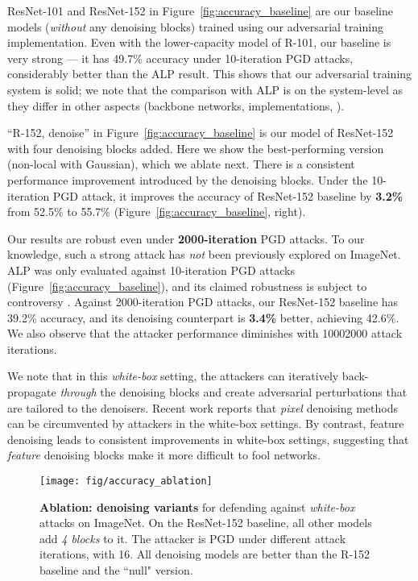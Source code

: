 \documentclass[10pt,twocolumn,letterpaper]{article}
\begin{document}
ResNet-101 and ResNet-152 in Figure~\ref{fig:accuracy_baseline} are our baseline models (\emph{without} any denoising blocks) trained using our adversarial training implementation. Even with the lower-capacity model of R-101, our baseline is very strong --- it has 49.7\% accuracy under 10-iteration PGD attacks, considerably better than the ALP result. This shows that our adversarial training system is solid; we note that the comparison with ALP is on the system-level as they differ in other aspects (backbone networks, implementations, \etc). 

``R-152, denoise'' in Figure~\ref{fig:accuracy_baseline} is our model of ResNet-152 with four denoising blocks added. Here we show the best-performing version (non-local with Gaussian), which we ablate next.  There is a consistent performance improvement introduced by the denoising blocks. Under the 10-iteration PGD attack, it improves the accuracy of ResNet-152 baseline by \textbf{3.2\%} from 52.5\% to 55.7\% (Figure~\ref{fig:accuracy_baseline}, right).

Our results are robust even under \textbf{2000-iteration} PGD attacks.
To our knowledge, such a strong attack has \emph{not} been previously explored on ImageNet.
ALP \cite{Kannan2018} was only evaluated against 10-iteration PGD attacks (Figure~\ref{fig:accuracy_baseline}), and its claimed robustness is subject to controversy \cite{Engstrom2018}.
Against 2000-iteration PGD attacks, our ResNet-152 baseline has 39.2\% accuracy, and its denoising counterpart is \textbf{3.4\%} better, achieving 42.6\%. We also observe that the attacker performance diminishes with 10002000 attack iterations.

We note that in this \emph{white-box} setting, the attackers can iteratively back-propagate \emph{through} the denoising blocks and create adversarial perturbations that are tailored to the denoisers. 
Recent work \cite{Athalye2018} reports that \emph{pixel} denoising methods can be circumvented by attackers in the white-box settings. 
By contrast, feature denoising leads to consistent improvements in white-box settings, suggesting that \emph{feature} denoising blocks make it more difficult to fool networks.

\begin{figure}[tp!]
\centering
\vspace{-.5em}
\texttt{[image: fig/accuracy\_ablation]}
\vspace{-1.8em}
\caption{\textbf{Ablation: denoising variants} for defending against \emph{white-box} attacks on ImageNet.
On the ResNet-152 baseline, all other models add \emph{4 blocks} to it.
The attacker is PGD under different attack iterations, with   16.
All denoising models are better than the R-152 baseline and the ``null" version.
}
\label{fig:accuracy_ablation}
\vspace{-1.5em}
\end{figure}
\end{document}

